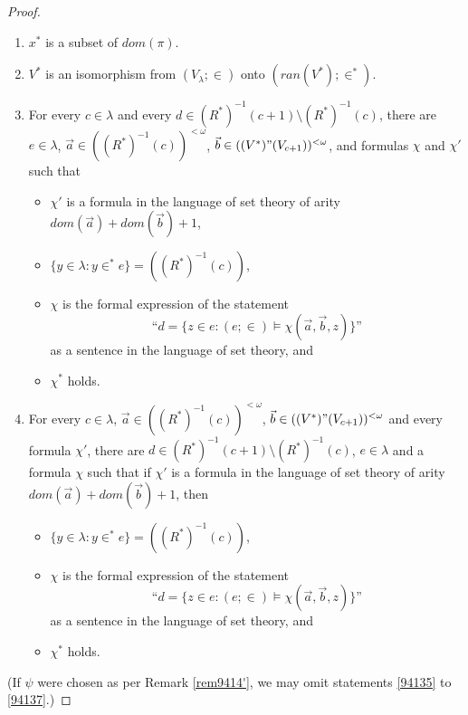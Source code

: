 \documentclass[12pt, twoside]{memoir}
\numberwithin{equation}{section}
\theoremstyle{definition}
\theoremstyle{remark}
\theoremstyle{definition}
\theoremstyle{definition}
\theoremstyle{definition}
\theoremstyle{remark}
\begin{document}
\begin{proof}
\begin{enumerate}[label=(\arabic*)]
    \item $x^*$ is a subset of $dom(\pi)$.
    \item\label{94135} $V^*$ is an isomorphism from $(V_{\lambda}; \in)$ onto $(ran(V^*); \in^*)$.
    \item For every $c \in \lambda$ and every $d \in (R^*)^{-1}(c+1) \setminus (R^*)^{-1}(c)$, there are $e \in \lambda$, $\Vec{a} \in ((R^*)^{-1}(c))^{< \omega}$, $\Vec{b} \in ((V^*)"(V_{c+1}))^{< \omega}$, and formulas $\chi$ and $\chi'$ such that
    \begin{itemize}
        \item $\chi'$ is a formula in the language of set theory of arity $dom(\Vec{a}) + dom(\Vec{b}) + 1$,
        \item $\{y \in \lambda : y \in^* e\} = ((R^*)^{-1}(c))$, 
        \item $\chi$ is the formal expression of the statement 
        \begin{equation*}
            \text{``} d = \{z \in e : (e; \in) \models \chi(\Vec{a}, \Vec{b}, z)\} \text{''}
        \end{equation*} 
        as a sentence in the language of set theory, and
        \item $\chi^*$ holds.
    \end{itemize}
    \item\label{94137} For every $c \in \lambda$, $\Vec{a} \in ((R^*)^{-1}(c))^{< \omega}$, $\Vec{b} \in ((V^*)"(V_{c+1}))^{< \omega}$ and every formula $\chi'$, there are $d \in (R^*)^{-1}(c+1) \setminus (R^*)^{-1}(c)$, $e \in \lambda$ and a formula $\chi$ such that if $\chi'$ is a formula in the language of set theory of arity $dom(\Vec{a}) + dom(\Vec{b}) + 1$, then
    \begin{itemize}
        \item $\{y \in \lambda : y \in^* e\} = ((R^*)^{-1}(c))$, 
        \item $\chi$ is the formal expression of the statement 
        \begin{equation*}
            \text{``} d = \{z \in e : (e; \in) \models \chi(\Vec{a}, \Vec{b}, z)\} \text{''}
        \end{equation*}
        as a sentence in the language of set theory, and
        \item $\chi^*$ holds.
    \end{itemize}
\end{enumerate}
(If $\psi$ were chosen as per Remark \ref{rem9414'}, we may omit statements \ref{94135} to \ref{94137}.)


\end{proof}
\end{document}
